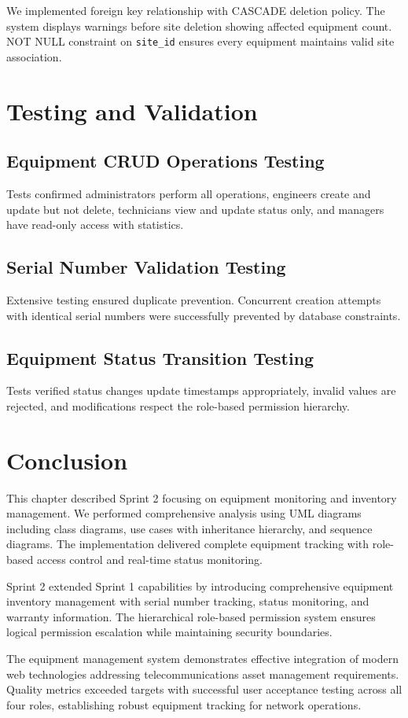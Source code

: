 We implemented foreign key relationship with CASCADE deletion policy. The system displays warnings before site deletion showing affected equipment count. NOT NULL constraint on \texttt{site\_id} ensures every equipment maintains valid site association.

\section{Testing and Validation}

\subsection{Equipment CRUD Operations Testing}
Tests confirmed administrators perform all operations, engineers create and update but not delete, technicians view and update status only, and managers have read-only access with statistics.

\subsection{Serial Number Validation Testing}
Extensive testing ensured duplicate prevention. Concurrent creation attempts with identical serial numbers were successfully prevented by database constraints.

\subsection{Equipment Status Transition Testing}
Tests verified status changes update timestamps appropriately, invalid values are rejected, and modifications respect the role-based permission hierarchy.

\section{Conclusion}

This chapter described Sprint 2 focusing on equipment monitoring and inventory management. We performed comprehensive analysis using UML diagrams including class diagrams, use cases with inheritance hierarchy, and sequence diagrams. The implementation delivered complete equipment tracking with role-based access control and real-time status monitoring.

Sprint 2 extended Sprint 1 capabilities by introducing comprehensive equipment inventory management with serial number tracking, status monitoring, and warranty information. The hierarchical role-based permission system ensures logical permission escalation while maintaining security boundaries.

The equipment management system demonstrates effective integration of modern web technologies addressing telecommunications asset management requirements. Quality metrics exceeded targets with successful user acceptance testing across all four roles, establishing robust equipment tracking for network operations.